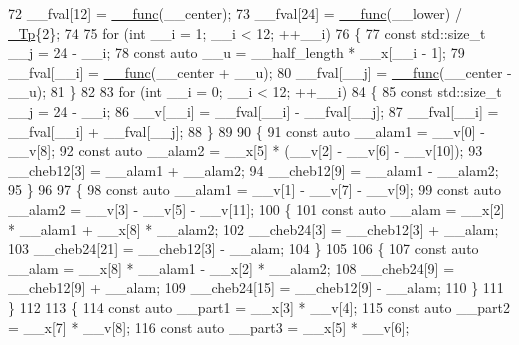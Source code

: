 \begin{DoxyCode}
72       \_\_fval[12] = \hyperlink{namespace____gnu__cxx_af2b2f0c7a2ae72b922b1afefae5a65b2}{\_\_func}(\_\_center);
73       \_\_fval[24] = \hyperlink{namespace____gnu__cxx_af2b2f0c7a2ae72b922b1afefae5a65b2}{\_\_func}(\_\_lower) / \hyperlink{namespace____gnu__cxx_a3b19a9c800ca194374ef9172290f7d79}{\_Tp}\{2\};
74 
75       \textcolor{keywordflow}{for} (\textcolor{keywordtype}{int} \_\_i = 1; \_\_i < 12; ++\_\_i)
76         \{
77           \textcolor{keyword}{const} std::size\_t \_\_j = 24 - \_\_i;
78           \textcolor{keyword}{const} \textcolor{keyword}{auto} \_\_u = \_\_half\_length * \_\_x[\_\_i - 1];
79           \_\_fval[\_\_i] = \hyperlink{namespace____gnu__cxx_af2b2f0c7a2ae72b922b1afefae5a65b2}{\_\_func}(\_\_center + \_\_u);
80           \_\_fval[\_\_j] = \hyperlink{namespace____gnu__cxx_af2b2f0c7a2ae72b922b1afefae5a65b2}{\_\_func}(\_\_center - \_\_u);
81         \}
82 
83       \textcolor{keywordflow}{for} (\textcolor{keywordtype}{int} \_\_i = 0; \_\_i < 12; ++\_\_i)
84         \{
85           \textcolor{keyword}{const} std::size\_t \_\_j = 24 - \_\_i;
86           \_\_v[\_\_i] = \_\_fval[\_\_i] - \_\_fval[\_\_j];
87           \_\_fval[\_\_i] = \_\_fval[\_\_i] + \_\_fval[\_\_j];
88         \}
89 
90       \{
91         \textcolor{keyword}{const} \textcolor{keyword}{auto} \_\_alam1 = \_\_v[0] - \_\_v[8];
92         \textcolor{keyword}{const} \textcolor{keyword}{auto} \_\_alam2 = \_\_x[5] * (\_\_v[2] - \_\_v[6] - \_\_v[10]);
93         \_\_cheb12[3] = \_\_alam1 + \_\_alam2;
94         \_\_cheb12[9] = \_\_alam1 - \_\_alam2;
95       \}
96 
97       \{
98         \textcolor{keyword}{const} \textcolor{keyword}{auto} \_\_alam1 = \_\_v[1] - \_\_v[7] - \_\_v[9];
99         \textcolor{keyword}{const} \textcolor{keyword}{auto} \_\_alam2 = \_\_v[3] - \_\_v[5] - \_\_v[11];
100         \{
101           \textcolor{keyword}{const} \textcolor{keyword}{auto} \_\_alam = \_\_x[2] * \_\_alam1 + \_\_x[8] * \_\_alam2;
102           \_\_cheb24[3] = \_\_cheb12[3] + \_\_alam;
103           \_\_cheb24[21] = \_\_cheb12[3] - \_\_alam;
104         \}
105 
106         \{
107           \textcolor{keyword}{const} \textcolor{keyword}{auto} \_\_alam = \_\_x[8] * \_\_alam1 - \_\_x[2] * \_\_alam2;
108           \_\_cheb24[9] = \_\_cheb12[9] + \_\_alam;
109           \_\_cheb24[15] = \_\_cheb12[9] - \_\_alam;
110         \}
111       \}
112 
113       \{
114         \textcolor{keyword}{const} \textcolor{keyword}{auto} \_\_part1 = \_\_x[3] * \_\_v[4];
115         \textcolor{keyword}{const} \textcolor{keyword}{auto} \_\_part2 = \_\_x[7] * \_\_v[8];
116         \textcolor{keyword}{const} \textcolor{keyword}{auto} \_\_part3 = \_\_x[5] * \_\_v[6];

\end{DoxyCode}
